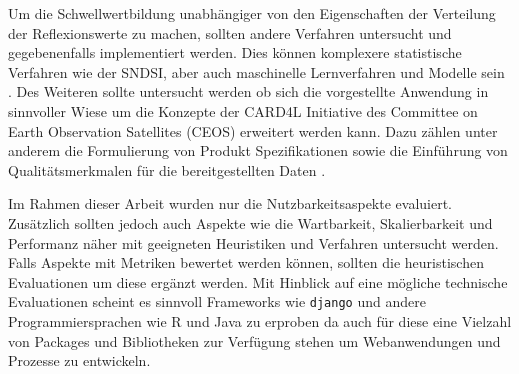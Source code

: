 Um die Schwellwertbildung unabhängiger von den Eigenschaften der Verteilung der Reflexionswerte zu machen, sollten 
andere Verfahren untersucht und gegebenenfalls implementiert werden. Dies können komplexere statistische Verfahren wie der SNDSI, aber auch maschinelle Lernverfahren und 
Modelle sein \cite{flood_proxy_mapping_ndsi,deep_learning_approach}. 
Des Weiteren sollte untersucht werden ob sich die vorgestellte Anwendung in sinnvoller Wiese 
um die Konzepte der CARD4L Initiative des Committee on Earth Observation Satellites (CEOS) erweitert werden kann. 
Dazu zählen unter anderem die Formulierung von Produkt Spezifikationen sowie die Einführung von Qualitätsmerkmalen für die bereitgestellten Daten \cite{testbed_16}. 

Im Rahmen dieser Arbeit wurden nur die Nutzbarkeitsaspekte evaluiert. Zusätzlich sollten jedoch auch Aspekte wie die Wartbarkeit, Skalierbarkeit und Performanz näher 
mit geeigneten Heuristiken und Verfahren untersucht werden. Falls Aspekte mit Metriken bewertet werden können, sollten die heuristischen Evaluationen um diese ergänzt werden. 
Mit Hinblick auf eine mögliche technische Evaluationen scheint es sinnvoll Frameworks wie \verb|django| und andere Programmiersprachen wie R und Java zu erproben da auch für diese 
eine Vielzahl von Packages und Bibliotheken zur Verfügung stehen um Webanwendungen und Prozesse zu entwickeln. 




